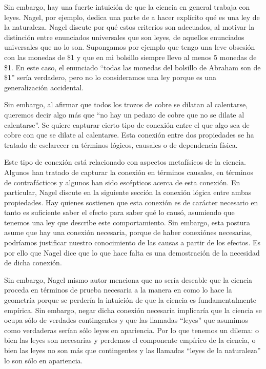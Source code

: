 Sin embargo, hay una fuerte intuición de que la ciencia en general trabaja con leyes. Nagel, por ejemplo, dedica una parte de \cite{Nagel2006} a hacer explícito qué es una ley de la naturaleza. Nagel discute por qué estos criterios son adecuados, al motivar la distinción entre enunciados universales que son leyes, de aquellos enunciados universales que no lo son. Supongamos por ejemplo que tengo una leve obsesión con las monedas de \$1 y que en mi bolsillo siempre llevo al menos 5 monedas de \$1. En este caso, el enunciado ``todas las monedas del bolsillo de Abraham son de \$1'' sería verdadero, pero no lo consideramos una ley porque es una generalización accidental.

Sin embargo, al afirmar que todos los trozos de cobre se dilatan al calentarse, queremos decir algo más que ``no hay un pedazo de cobre que no se dilate al calentarse''. Se quiere capturar cierto tipo de conexión entre el que algo sea de cobre con que se dilate al calentarse. Esta conexión entre dos propiedades se ha tratado de esclarecer en términos lógicos, causales o de dependencia física.

Este tipo de conexión está relacionado con aspectos metafísicos de la ciencia. Algunos han tratado de capturar la conexión en términos causales, en términos de contrafácticos y algunos han sido escépticos acerca de esta conexión. En particular, Nagel discute en la siguiente sección la conexión lógica entre ambas propiedades. Hay quienes sostienen que esta conexión es de carácter necesario en tanto es suficiente saber el efecto para saber qué lo causó, asumiendo que tenemos una ley que describe este comportamiento. Sin embargo, esta postura asume que hay una conexión necesaria, porque de haber conexiónes necesarias, podríamos justificar nuestro conocimiento de las causas a partir de los efectos. Es por ello que Nagel dice que lo que hace falta es una demostración de la necesidad de dicha conexión.

Sin embargo, Nagel mismo autor menciona que no sería deseable que la ciencia proceda en términos de prueba necesaria a la manera en como lo hace la geometría \cite[cfr., p. 53]{Nagel2006} porque se perdería la intuición de que la ciencia es fundamentalmente empírica. Sin embargo, negar dicha conexión necesaria implicaría que la ciencia se ocupa sólo de verdades contingentes  y que las llamadas ``leyes'' que asumimos como verdaderas serían sólo leyes en apariencia. Por lo que tenemos un dilema: o bien las leyes son necesarias y perdemos el componente empírico de la ciencia, o bien las leyes no son más que contingentes y las llamadas ``leyes de la naturaleza'' lo son sólo en apariencia.

